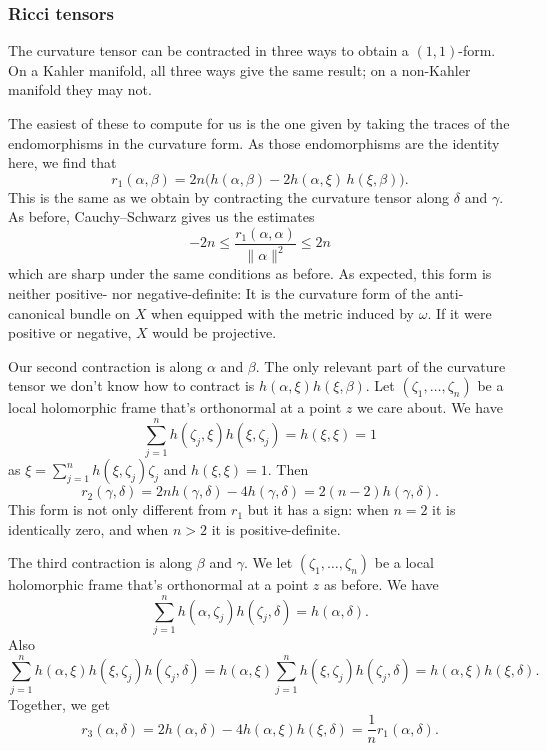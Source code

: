 \documentclass[11pt]{article}
\begin{document}
\subsubsection{Ricci tensors}
\label{sec:org3942125}

The curvature tensor can be contracted in three ways to obtain a \((1,1)\)-form. On a Kahler manifold, all three ways give the same result; on a non-Kahler manifold they may not.

The easiest of these to compute for us is the one given by taking the traces of the endomorphisms in the curvature form. As those endomorphisms are the identity here, we find that
$$
r_1(\alpha, \beta)
= 2n \bigl( h(\alpha, \beta) - 2 h(\alpha, \xi) \, h(\xi, \beta) \bigr).
$$
This is the same as we obtain by contracting the curvature tensor along \(\delta\) and \(\gamma\). As before, Cauchy--Schwarz gives us the estimates
$$
-2n
\leq \frac{r_1(\alpha, \alpha)}{\|\alpha\|^2}
\leq 2n
$$
which are sharp under the same conditions as before. As expected, this form is neither positive- nor negative-definite: It is the curvature form of the anti-canonical bundle on \(X\) when equipped with the metric induced by \(\omega\). If it were positive or negative, \(X\) would be projective.

Our second contraction is along \(\alpha\) and \(\beta\). The only relevant part of the curvature tensor we don't know how to contract is \(h(\alpha, \xi)h(\xi, \beta)\). Let \((\zeta_1, \ldots, \zeta_n)\) be a local holomorphic frame that's orthonormal at a point \(z\) we care about. We have
$$
\sum_{j=1}^n h(\zeta_j, \xi) h(\xi, \zeta_j) = h(\xi, \xi) = 1
$$
as \(\xi = \sum_{j=1}^n h(\xi, \zeta_j) \zeta_j\) and \(h(\xi,\xi) = 1\).
Then
$$
r_2(\gamma, \delta)
= 2n h(\gamma, \delta) - 4 h(\gamma, \delta)
= 2(n-2) h(\gamma, \delta).
$$
This form is not only different from \(r_1\) but it has a sign: when \(n = 2\) it is identically zero, and when \(n > 2\) it is positive-definite.

The third contraction is along \(\beta\) and \(\gamma\). We let \((\zeta_1, \ldots, \zeta_n)\) be a local holomorphic frame that's orthonormal at a point \(z\) as before. We have
$$
\sum_{j=1}^n h(\alpha, \zeta_j) h(\zeta_j, \delta)
= h(\alpha, \delta).
$$
Also
$$
\sum_{j=1}^n h(\alpha, \xi) h(\xi, \zeta_j) h(\zeta_j, \delta)
= h(\alpha, \xi) \sum_{j=1}^n  h(\xi, \zeta_j) h(\zeta_j, \delta)
= h(\alpha, \xi) h(\xi, \delta).
$$
Together, we get
$$
r_3(\alpha, \delta)
= 2 h(\alpha, \delta) - 4 h(\alpha, \xi) h(\xi, \delta)
= \frac{1}{n} r_1(\alpha, \delta).
$$
\end{document}
